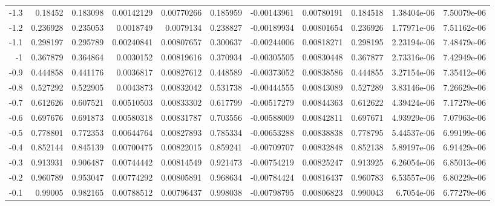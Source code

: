 {\begin{tabular}{rrrrrrrrrrr}
 -1.3         & 0.18452    & 0.183098   &   0.00142129  &    0.00770266 & 0.185959   &  -0.00143961  &    0.00780191 & 0.184518   &   1.38404e-06 &   7.50079e-06 \\
 -1.2         & 0.236928   & 0.235053   &   0.0018749   &    0.0079134  & 0.238827   &  -0.00189934  &    0.00801654 & 0.236926   &   1.77971e-06 &   7.51162e-06 \\
 -1.1         & 0.298197   & 0.295789   &   0.00240841  &    0.00807657 & 0.300637   &  -0.00244006  &    0.00818271 & 0.298195   &   2.23194e-06 &   7.48479e-06 \\
 -1           & 0.367879   & 0.364864   &   0.0030152   &    0.00819616 & 0.370934   &  -0.00305505  &    0.00830448 & 0.367877   &   2.73316e-06 &   7.42949e-06 \\
 -0.9         & 0.444858   & 0.441176   &   0.0036817   &    0.00827612 & 0.448589   &  -0.00373052  &    0.00838586 & 0.444855   &   3.27154e-06 &   7.35412e-06 \\
 -0.8         & 0.527292   & 0.522905   &   0.0043873   &    0.00832042 & 0.531738   &  -0.00444555  &    0.00843089 & 0.527289   &   3.83146e-06 &   7.26629e-06 \\
 -0.7         & 0.612626   & 0.607521   &   0.00510503  &    0.00833302 & 0.617799   &  -0.00517279  &    0.00844363 & 0.612622   &   4.39424e-06 &   7.17279e-06 \\
 -0.6         & 0.697676   & 0.691873   &   0.00580318  &    0.00831787 & 0.703556   &  -0.00588009  &    0.00842811 & 0.697671   &   4.93929e-06 &   7.07963e-06 \\
 -0.5         & 0.778801   & 0.772353   &   0.00644764  &    0.00827893 & 0.785334   &  -0.00653288  &    0.00838838 & 0.778795   &   5.44537e-06 &   6.99199e-06 \\
 -0.4         & 0.852144   & 0.845139   &   0.00700475  &    0.00822015 & 0.859241   &  -0.00709707  &    0.00832848 & 0.852138   &   5.89197e-06 &   6.91429e-06 \\
 -0.3         & 0.913931   & 0.906487   &   0.00744442  &    0.00814549 & 0.921473   &  -0.00754219  &    0.00825247 & 0.913925   &   6.26054e-06 &   6.85013e-06 \\
 -0.2         & 0.960789   & 0.953047   &   0.00774292  &    0.00805891 & 0.968634   &  -0.00784424  &    0.00816437 & 0.960783   &   6.53557e-06 &   6.80229e-06 \\
 -0.1         & 0.99005    & 0.982165   &   0.00788512  &    0.00796437 & 0.998038   &  -0.00798795  &    0.00806823 & 0.990043   &   6.7054e-06  &   6.77279e-06 \\

\end{tabular}}
